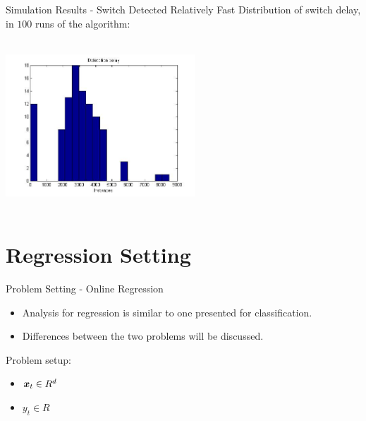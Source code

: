 \documentclass{beamer}
\begin{document}
\begin{frame}{Simulation Results - Switch Detected Relatively Fast}
Distribution of switch delay, in $100$ runs of the algorithm:
\begin{center}
\includegraphics[height=2.5in,width=2.8in]{delay_clas_alg3_ver1.jpg}
\end{center}
\end{frame}


\section{Regression Setting}
\begin{frame}{Problem Setting - Online Regression}
\begin{itemize}
\item Analysis for regression is similar to one presented for classification.\newline
\item  Differences between the two problems will be discussed.\newline
\end{itemize}

Problem setup:

\begin{itemize}
\item ${\boldsymbol{x}}_{t}\in R^d$
\item $y_t\in R$
\end{itemize}

\end{frame}
\end{document}
